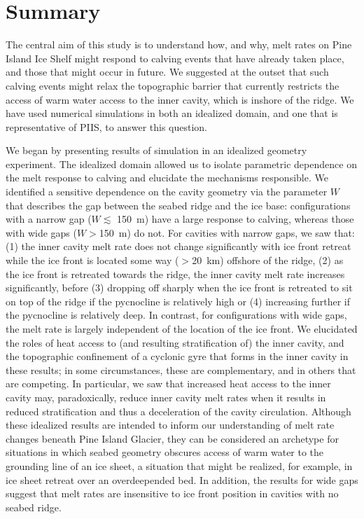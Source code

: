 \documentclass[draft]{agujournal2019}
\begin{document}
\section{Summary}\label{S:Summary}
The central aim of this study is to understand how, and why, melt rates on Pine Island Ice Shelf might respond to calving events that have already taken place, and those that might occur in future. We suggested at the outset that such calving events might relax the topographic barrier that currently restricts the access of warm water access to the inner cavity, which is inshore of the ridge. We have used numerical simulations in both an idealized domain, and one that is representative of PIIS, to answer this question.

We began by presenting results of simulation in an idealized geometry experiment. The idealized domain allowed us to isolate parametric dependence on the melt response to calving and elucidate the mechanisms responsible. We identified a sensitive dependence on the cavity geometry via the parameter $W$ that describes the gap between the seabed ridge and the ice base: configurations with a narrow gap ($W \lesssim$ 150~m) have a large response to calving, whereas those with wide gaps ($W>$150~m) do not. For cavities with narrow gaps, we saw that: (1) the inner cavity melt rate does not change significantly with ice front retreat while the ice front is located some way ($>$20~km) offshore of the ridge, (2) as the ice front is retreated towards the ridge, the inner cavity melt rate increases significantly, before (3) dropping off sharply when the ice front is retreated to sit on top of the ridge if the pycnocline is relatively high or (4) increasing further if the pycnocline is relatively deep. In contrast, for configurations with wide gaps, the melt rate is largely independent of the location of the ice front. We elucidated the roles of heat access to (and resulting stratification of) the inner cavity, and the topographic confinement of a cyclonic gyre that forms in the inner cavity in these results; in some circumstances, these are complementary, and in others that are competing. In particular, we saw that increased heat access to the inner cavity may, paradoxically, reduce inner cavity melt rates when it results in reduced stratification and thus a deceleration of the cavity circulation. Although these idealized results are intended to inform our understanding of melt rate changes beneath Pine Island Glacier, they can be considered an archetype for situations in which seabed geometry obscures access of warm water to the grounding line of an ice sheet, a situation that might be realized, for example, in ice sheet retreat over an overdeepended bed. In addition, the results for wide gaps suggest that melt rates are insensitive to ice front position in cavities with no seabed ridge. 
\end{document}
